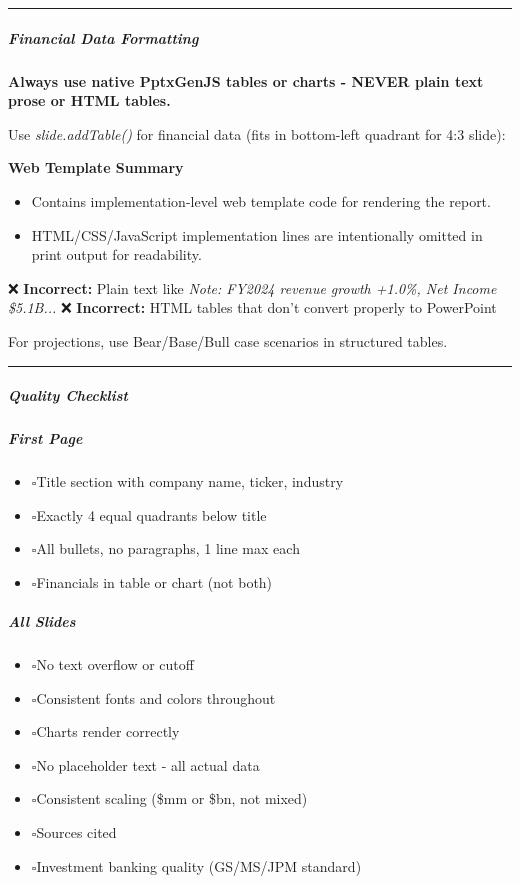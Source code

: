 \documentclass[11pt]{article}
\newcommand{\UncheckedBox}{$\square$}
\begin{document}
\vspace{0.5em}\hrule\vspace{0.5em}

\subparagraph{Financial Data Formatting}\mbox{}\par

\textbf{Always use native PptxGenJS tables or charts - NEVER plain text prose or HTML tables.}


Use \emph{slide.addTable()} for financial data (fits in bottom-left quadrant for 4:3 slide):

\textbf{Web Template Summary}
\begin{itemize}[leftmargin=*,itemsep=2pt,topsep=2pt]
\item {} Contains implementation-level web template code for rendering the report.
\item {} HTML/CSS/JavaScript implementation lines are intentionally omitted in print output for readability.
\end{itemize}

❌ \textbf{Incorrect:} Plain text like \emph{Note: FY2024 revenue growth +1.0\%, Net Income \$5.1B...} ❌ \textbf{Incorrect:} HTML tables that don't convert properly to PowerPoint


For projections, use Bear/Base/Bull case scenarios in structured tables.


\vspace{0.5em}\hrule\vspace{0.5em}

\subparagraph{Quality Checklist}\mbox{}\par

\subparagraph{First Page}\mbox{}\par
\begin{itemize}[leftmargin=*,itemsep=2pt,topsep=2pt]
\item {} \UncheckedBox Title section with company name, ticker, industry
\item {} \UncheckedBox Exactly 4 equal quadrants below title
\item {} \UncheckedBox All bullets, no paragraphs, 1 line max each
\item {} \UncheckedBox Financials in table or chart (not both)
\end{itemize}

\subparagraph{All Slides}\mbox{}\par
\begin{itemize}[leftmargin=*,itemsep=2pt,topsep=2pt]
\item {} \UncheckedBox No text overflow or cutoff
\item {} \UncheckedBox Consistent fonts and colors throughout
\item {} \UncheckedBox Charts render correctly
\item {} \UncheckedBox No placeholder text - all actual data
\item {} \UncheckedBox Consistent scaling (\$mm or \$bn, not mixed)
\item {} \UncheckedBox Sources cited
\item {} \UncheckedBox Investment banking quality (GS/MS/JPM standard)
\end{itemize}
\end{document}
